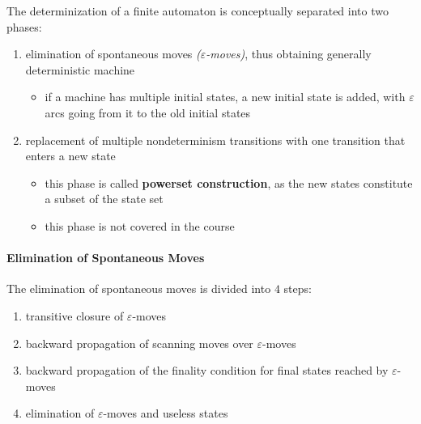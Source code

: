 \documentclass[english]{article}
\begin{document}
The determinization of a finite automaton is conceptually separated into two phases:

\begin{enumerate}
  \item elimination of spontaneous moves \textit{(\(\varepsilon\)-moves)}, thus obtaining generally deterministic machine
        \begin{itemize}[label=\(\rightarrow\)]
          \item if a machine has multiple initial states, a new initial state is added, with \(\varepsilon\) arcs going from it to the old initial states
        \end{itemize}
  \item replacement of multiple nondeterminism transitions with one transition that enters a new state
        \begin{itemize}[label=\(\rightarrow\)]
          \item this phase is called \textbf{powerset construction}, as the new states constitute a subset of the state set
          \item this phase is not covered in the course
        \end{itemize}
\end{enumerate}

\paragraph{Elimination of Spontaneous Moves}

The elimination of spontaneous moves is divided into \(4\) steps:

\begin{enumerate}
  \item transitive closure of \(\varepsilon\)-moves
        \begin{figure}[ht]
          \centering
          
        \end{figure}
  \item backward propagation of scanning moves over \(\varepsilon\)-moves
        \begin{figure}[ht]
          \centering
          
        \end{figure}
  \item backward propagation of the finality condition for final states reached by \(\varepsilon\)-moves
        \begin{figure}[ht]
          \centering
          
        \end{figure}
  \item elimination of \(\varepsilon\)-moves and useless states
\end{enumerate}
\end{document}
